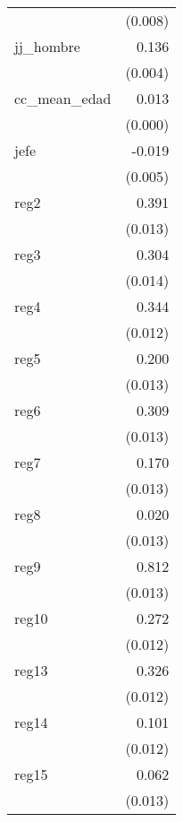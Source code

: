 {\begin{longtable}{l*{1}{D{.}{.}{-1}}}
            &     (0.008)         \\
\addlinespace
jj\_hombre   &       0.136\sym{***}\\
            &     (0.004)         \\
\addlinespace
cc\_mean\_edad&       0.013\sym{***}\\
            &     (0.000)         \\
\addlinespace
jefe        &      -0.019\sym{***}\\
            &     (0.005)         \\
\addlinespace
reg2        &       0.391\sym{***}\\
            &     (0.013)         \\
\addlinespace
reg3        &       0.304\sym{***}\\
            &     (0.014)         \\
\addlinespace
reg4        &       0.344\sym{***}\\
            &     (0.012)         \\
\addlinespace
reg5        &       0.200\sym{***}\\
            &     (0.013)         \\
\addlinespace
reg6        &       0.309\sym{***}\\
            &     (0.013)         \\
\addlinespace
reg7        &       0.170\sym{***}\\
            &     (0.013)         \\
\addlinespace
reg8        &       0.020         \\
            &     (0.013)         \\
\addlinespace
reg9        &       0.812\sym{***}\\
            &     (0.013)         \\
\addlinespace
reg10       &       0.272\sym{***}\\
            &     (0.012)         \\
\addlinespace
reg13       &       0.326\sym{***}\\
            &     (0.012)         \\
\addlinespace
reg14       &       0.101\sym{***}\\
            &     (0.012)         \\
\addlinespace
reg15       &       0.062\sym{***}\\
            &     (0.013)         \\

\end{longtable}}
